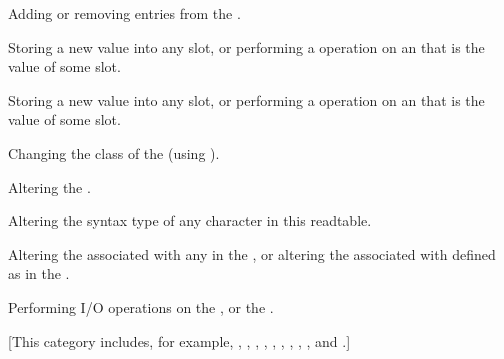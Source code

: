 Adding or removing entries from the .



Storing a new value into any slot,
or performing a  operation on an  
that is the value of some slot.



Storing a new value into any slot,
or performing a  operation on an  
that is the value of some slot.

Changing the class of the  (\eg using ).



Altering the .

Altering the syntax type of any character in this readtable.

Altering the  associated with any 
in the , or altering the 
associated with  defined as 
in the .



Performing I/O operations on the ,
or  the .


 [This category includes, for example, ,
                                      ,
                                      ,
                                      ,
                                      ,
                                      ,
                                      ,
                                      ,
                                      ,
                                  and .]

